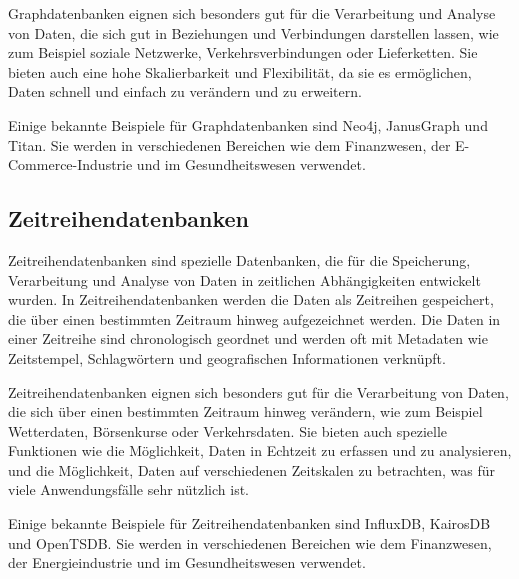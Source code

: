 Graphdatenbanken eignen sich besonders gut für die Verarbeitung und Analyse von Daten, die sich gut in Beziehungen und Verbindungen darstellen lassen, wie zum Beispiel soziale Netzwerke, Verkehrsverbindungen oder Lieferketten. Sie bieten auch eine hohe Skalierbarkeit und Flexibilität, da sie es ermöglichen, Daten schnell und einfach zu verändern und zu erweitern.

Einige bekannte Beispiele für Graphdatenbanken sind Neo4j, JanusGraph und Titan. Sie werden in verschiedenen Bereichen wie dem Finanzwesen, der E-Commerce-Industrie und im Gesundheitswesen verwendet.


\subsection{Zeitreihendatenbanken}
Zeitreihendatenbanken sind spezielle Datenbanken, die für die Speicherung, Verarbeitung und Analyse von Daten in zeitlichen Abhängigkeiten entwickelt wurden. In Zeitreihendatenbanken werden die Daten als Zeitreihen gespeichert, die über einen bestimmten Zeitraum hinweg aufgezeichnet werden. Die Daten in einer Zeitreihe sind chronologisch geordnet und werden oft mit Metadaten wie Zeitstempel, Schlagwörtern und geografischen Informationen verknüpft.

Zeitreihendatenbanken eignen sich besonders gut für die Verarbeitung von Daten, die sich über einen bestimmten Zeitraum hinweg verändern, wie zum Beispiel Wetterdaten, Börsenkurse oder Verkehrsdaten. Sie bieten auch spezielle Funktionen wie die Möglichkeit, Daten in Echtzeit zu erfassen und zu analysieren, und die Möglichkeit, Daten auf verschiedenen Zeitskalen zu betrachten, was für viele Anwendungsfälle sehr nützlich ist.

Einige bekannte Beispiele für Zeitreihendatenbanken sind InfluxDB, KairosDB und OpenTSDB. Sie werden in verschiedenen Bereichen wie dem Finanzwesen, der Energieindustrie und im Gesundheitswesen verwendet.





